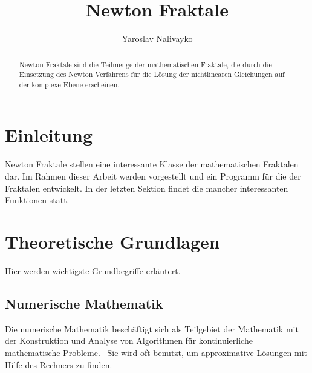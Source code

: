 \documentclass[a4paper,12pt]{llncs}
\numberwithin{equation}{section}
\begin{document}


\author{Yaroslav Nalivayko}

\title{Newton Fraktale}

\maketitle

\thispagestyle{empty}

\begin{abstract}
Newton Fraktale sind die Teilmenge der mathematischen Fraktale, die durch die Einsetzung des Newton Verfahrens für die Lösung der nichtlinearen Gleichungen auf der komplexe Ebene erscheinen.
\end{abstract}

\section{Einleitung}
Newton Fraktale stellen eine interessante Klasse der mathematischen Fraktalen dar. 
Im Rahmen dieser Arbeit werden  vorgestellt und ein Programm für die  der Fraktalen entwickelt. In der letzten Sektion findet die  mancher interessanten Funktionen statt.


\section{Theoretische Grundlagen}\label{sec:theo}
Hier werden wichtigste Grundbegriffe erläutert.

\subsection{Numerische Mathematik}
Die numerische Mathematik beschäftigt sich als Teilgebiet der Mathematik mit der Konstruktion und Analyse von Algorithmen für kontinuierliche mathematische Probleme.~\cite{nummath}
Sie wird oft benutzt, um approximative Lösungen mit Hilfe des Rechners zu finden.
\end{document}
